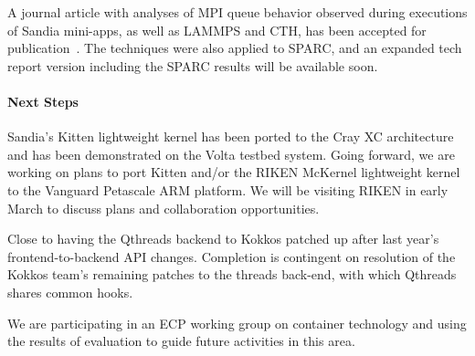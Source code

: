 A journal article with analyses of MPI queue behavior observed during
executions of Sandia mini-apps, as well as LAMMPS and CTH, has been
accepted for publication~\cite{Ferreira:Characterizing:2018}.  The
techniques were also applied to SPARC, and an expanded tech report
version including the SPARC results will be available soon.

\paragraph{Next Steps}

Sandia's Kitten lightweight kernel has been ported to the Cray
XC architecture and has been demonstrated on the Volta testbed system.
Going forward, we are working on plans to port Kitten and/or the RIKEN
McKernel lightweight kernel to the Vanguard Petascale ARM platform.
We will be visiting RIKEN in early March to discuss plans and
collaboration opportunities.

Close to having the Qthreads backend to Kokkos patched up after last
year's frontend-to-backend API changes.  Completion is contingent on
resolution of the Kokkos team's remaining patches to the threads
back-end, with which Qthreads shares common hooks.

We are participating in an ECP working group on container technology
and using the results of evaluation to guide future activities in this
area.


